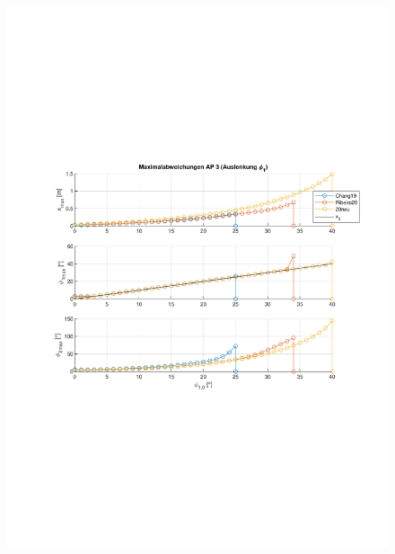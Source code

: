 \begin{figure}
\begin{minipage}[t]{0.45\linewidth}
		\includegraphics[scale=0.47]{Bilder/Parameter neu (Ribeiro) Creg off/AP3.pdf}
		\label{fig:ap3}
	 \end{minipage}
	\\
	\begin{minipage}[t]{0.45\linewidth}
		\centering

\end{minipage}
\end{figure}
